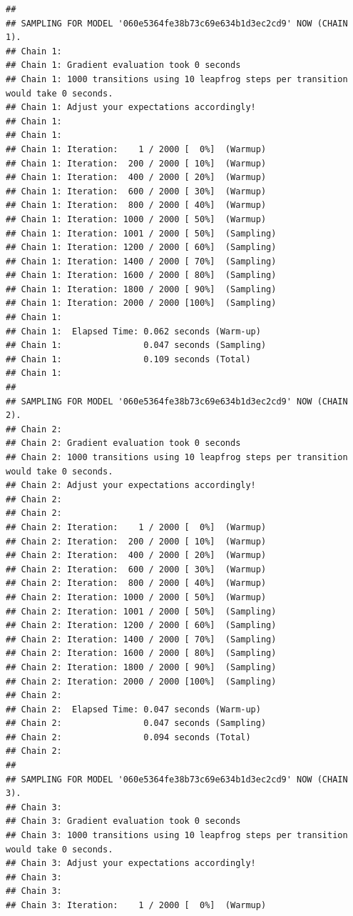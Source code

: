 \documentclass[]{article}
\begin{document}
\begin{verbatim}
## 
## SAMPLING FOR MODEL '060e5364fe38b73c69e634b1d3ec2cd9' NOW (CHAIN 1).
## Chain 1: 
## Chain 1: Gradient evaluation took 0 seconds
## Chain 1: 1000 transitions using 10 leapfrog steps per transition would take 0 seconds.
## Chain 1: Adjust your expectations accordingly!
## Chain 1: 
## Chain 1: 
## Chain 1: Iteration:    1 / 2000 [  0%]  (Warmup)
## Chain 1: Iteration:  200 / 2000 [ 10%]  (Warmup)
## Chain 1: Iteration:  400 / 2000 [ 20%]  (Warmup)
## Chain 1: Iteration:  600 / 2000 [ 30%]  (Warmup)
## Chain 1: Iteration:  800 / 2000 [ 40%]  (Warmup)
## Chain 1: Iteration: 1000 / 2000 [ 50%]  (Warmup)
## Chain 1: Iteration: 1001 / 2000 [ 50%]  (Sampling)
## Chain 1: Iteration: 1200 / 2000 [ 60%]  (Sampling)
## Chain 1: Iteration: 1400 / 2000 [ 70%]  (Sampling)
## Chain 1: Iteration: 1600 / 2000 [ 80%]  (Sampling)
## Chain 1: Iteration: 1800 / 2000 [ 90%]  (Sampling)
## Chain 1: Iteration: 2000 / 2000 [100%]  (Sampling)
## Chain 1: 
## Chain 1:  Elapsed Time: 0.062 seconds (Warm-up)
## Chain 1:                0.047 seconds (Sampling)
## Chain 1:                0.109 seconds (Total)
## Chain 1: 
## 
## SAMPLING FOR MODEL '060e5364fe38b73c69e634b1d3ec2cd9' NOW (CHAIN 2).
## Chain 2: 
## Chain 2: Gradient evaluation took 0 seconds
## Chain 2: 1000 transitions using 10 leapfrog steps per transition would take 0 seconds.
## Chain 2: Adjust your expectations accordingly!
## Chain 2: 
## Chain 2: 
## Chain 2: Iteration:    1 / 2000 [  0%]  (Warmup)
## Chain 2: Iteration:  200 / 2000 [ 10%]  (Warmup)
## Chain 2: Iteration:  400 / 2000 [ 20%]  (Warmup)
## Chain 2: Iteration:  600 / 2000 [ 30%]  (Warmup)
## Chain 2: Iteration:  800 / 2000 [ 40%]  (Warmup)
## Chain 2: Iteration: 1000 / 2000 [ 50%]  (Warmup)
## Chain 2: Iteration: 1001 / 2000 [ 50%]  (Sampling)
## Chain 2: Iteration: 1200 / 2000 [ 60%]  (Sampling)
## Chain 2: Iteration: 1400 / 2000 [ 70%]  (Sampling)
## Chain 2: Iteration: 1600 / 2000 [ 80%]  (Sampling)
## Chain 2: Iteration: 1800 / 2000 [ 90%]  (Sampling)
## Chain 2: Iteration: 2000 / 2000 [100%]  (Sampling)
## Chain 2: 
## Chain 2:  Elapsed Time: 0.047 seconds (Warm-up)
## Chain 2:                0.047 seconds (Sampling)
## Chain 2:                0.094 seconds (Total)
## Chain 2: 
## 
## SAMPLING FOR MODEL '060e5364fe38b73c69e634b1d3ec2cd9' NOW (CHAIN 3).
## Chain 3: 
## Chain 3: Gradient evaluation took 0 seconds
## Chain 3: 1000 transitions using 10 leapfrog steps per transition would take 0 seconds.
## Chain 3: Adjust your expectations accordingly!
## Chain 3: 
## Chain 3: 
## Chain 3: Iteration:    1 / 2000 [  0%]  (Warmup)

\end{verbatim}
\end{document}
